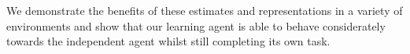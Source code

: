We demonstrate the benefits of these estimates and representations in a variety of environments and show that our learning agent is able to behave considerately towards the independent agent whilst still completing its own task. 
\fi
